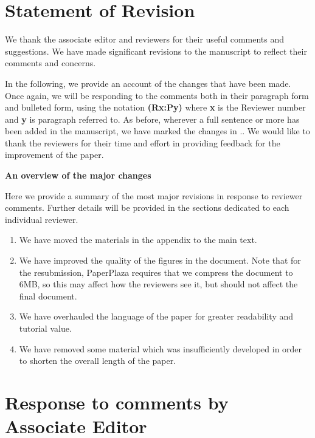 \documentclass{letter}
\newcommand{\rr}[1]{{\bf \color{blue}{#1}}}
\begin{document}
\section{Statement of Revision}

We thank the associate editor and reviewers for their useful comments and suggestions. We have made significant revisions to the manuscript to reflect their comments and concerns. 

In the following, we provide an account of the changes that have been made. Once again, we will be responding to the comments both in their paragraph form and bulleted form, using the notation {\bf {\color{red}(Rx:Py)}} where {\bf x} is the Reviewer number and {\bf y} is paragraph referred to. %
As before, wherever a full sentence or more has been added in the manuscript, we have marked the changes in \rr{blue}.. We would like to thank the reviewers for their time and effort in providing feedback for the improvement of the paper.

\noindent\textbf{An overview of the major changes}

Here we provide a summary of the most major revisions in response to reviewer comments. Further details will be provided in the sections dedicated to each individual reviewer.

\begin{enumerate}
\item We have moved the materials in the appendix to the main text.
\item We have improved the quality of the figures in the document. Note that for the resubmission, PaperPlaza requires that we compress the document to 6MB, so this may affect how the reviewers see it, but should not affect the final document.
\item We have overhauled the language of the paper for greater readability and tutorial value.
\item We have removed some material which was insufficiently developed in order to shorten the overall length of the paper.

\end{enumerate}

\section{Response to comments by Associate Editor}
\end{document}
